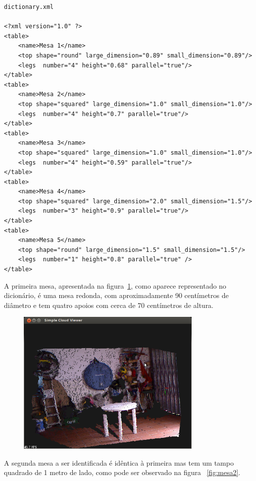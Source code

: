 \begin{verbatim}
dictionary.xml

<?xml version="1.0" ?>
<table>
	<name>Mesa 1</name>
	<top shape="round" large_dimension="0.89" small_dimension="0.89"/>
	<legs  number="4" height="0.68" parallel="true"/>
</table>
<table>
	<name>Mesa 2</name>
	<top shape="squared" large_dimension="1.0" small_dimension="1.0"/>
	<legs  number="4" height="0.7" parallel="true"/>
</table>
<table>
	<name>Mesa 3</name>
	<top shape="squared" large_dimension="1.0" small_dimension="1.0"/>
	<legs  number="4" height="0.59" parallel="true"/>
</table>
<table>
	<name>Mesa 4</name>
	<top shape="squared" large_dimension="2.0" small_dimension="1.5"/>
	<legs  number="3" height="0.9" parallel="true"/>
</table>
<table>
	<name>Mesa 5</name>
	<top shape="round" large_dimension="1.5" small_dimension="1.5"/>
	<legs  number="1" height="0.8" parallel="true" />
</table>
\end{verbatim}



A primeira mesa, apresentada na figura~\ref{fig:mesa1}, como aparece representado no dicionário, é uma mesa redonda, com aproximadamente 90 centímetros de diâmetro e tem quatro apoios com cerca de 70 centímetros de altura.

\begin{figure}[htb]
\begin{center}
	\includegraphics[width=0.80\textwidth]{figures/exemplo_captura.png}
	\label{fig:mesa1}
\end{center}
\end{figure}

A segunda mesa a ser identificada é idêntica à primeira mas tem um tampo quadrado de 1 metro de lado, como pode ser observado na figura ~\ref{fig:mesa2}.

